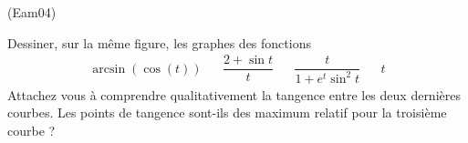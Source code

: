 \begin{tiny}(Eam04)\end{tiny}
Dessiner, sur la même figure, les graphes des fonctions
\begin{align*}
 \arcsin(\cos(t)) & & \dfrac{2+\sin t}{t} & & \dfrac{t}{1+e^t\sin^2t} & & t
\end{align*}
Attachez vous à comprendre qualitativement la tangence entre les deux dernières courbes. Les points de tangence sont-ils des maximum relatif pour la troisième courbe ?